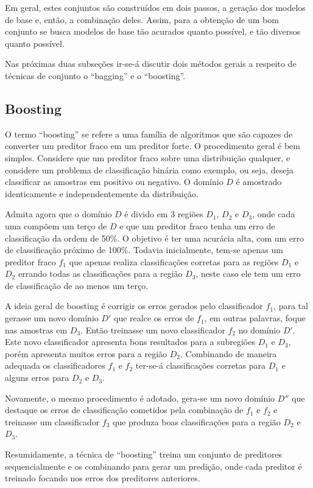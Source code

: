 Em geral, estes conjuntos são construídos em dois passos, a geração dos modelos de base e, então, a combinação deles. Assim, para a obtenção de um bom conjunto se busca modelos de base tão acurados quanto possível, e tão diversos quanto possível. 

Nas próximas duas subseções ir-se-á discutir dois métodos gerais a respeito de técnicas de conjunto o ``bagging'' e o ``boosting''.

\subsection{Boosting}

O termo ``boosting'' se refere a uma família de algoritmos que são capazes de converter um preditor fraco em um preditor forte. O procedimento geral é bem simples. Considere que um preditor fraco sobre uma distribuição qualquer, e considere um problema de classificação binária como exemplo, ou seja, deseja classificar as amostras em positivo ou negativo. O domínio $D$ é amostrado identicamente e independentemente da distribuição.

Admita agora que o domínio $D$ é divido em 3 regiões $D_1$, $D_2$ e $D_3$, onde cada uma compõem um terço de $D$ e que um preditor fraco tenha um erro de classificação da ordem de 50\%. O objetivo é ter uma acurácia alta, com um erro de classificação próximo de 100\%. Todavia inicialmente, tem-se apenas um preditor fraco $f_1$ que apenas realiza classificações corretas para as regiões $D_1$ e $D_2$ errando todas as classificações para a região $D_3$, neste caso ele tem um erro de classificação de ao menos um terço.

A ideia geral de boosting é corrigir os erros gerados pelo classificador $f_1$, para tal gerasse um novo domínio $D'$ que realce os erros de $f_1$, em outras palavras, foque nas amostras em $D_3$. Então treinasse um novo classificador $f_2$  no domínio $D'$. Este novo classificador apresenta bons resultados para a subregiões $D_1$ e $D_3$, porém apresenta muitos erros para a região $D_2$. Combinando de maneira adequada os classificadores $f_1$ e $f_2$ ter-se-á classificações corretas para $D_1$ e alguns erros para $D_2$ e $D_3$.

Novamente, o mesmo procedimento é adotado, gera-se um novo domínio $D''$ que destaque os erros de classificação cometidos pela combinação de $f_1$ e $f_2$ e treinasse um classificador $f_3$ que produza boas classificações para a região $D_2$ e $D_3$.

Resumidamente, a técnica de ``boosting'' treina um conjunto de preditores sequencialmente e os combinando para gerar um predição, onde cada preditor é treinado focando nos erros dos preditores anteriores.

